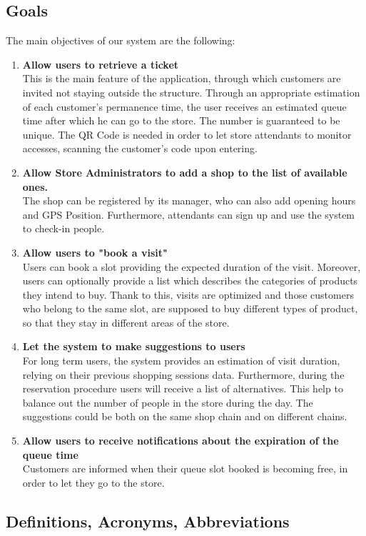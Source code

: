 \documentclass[table, 12pt]{article}
\begin{document}
\subsection{Goals}
\label{goals}
The main objectives of our system are the following:
\begin{enumerate}[label=$\bullet$ \textbf{G\arabic*:}]
    \item \textbf{Allow users to retrieve a ticket}\\This is the main feature of the application, through which customers are invited not staying outside the structure. Through an appropriate estimation of each customer's permanence time, the user receives an estimated queue time after which he can go to the store. The number is guaranteed to be unique. The QR Code is needed in order to let store attendants to monitor accesses, scanning the customer's code upon entering.
    \item \textbf{Allow Store Administrators to add a shop to the list of available ones.}\\The shop can be registered by its manager, who can also add opening hours and GPS Position. Furthermore, attendants can sign up and use the system to check-in people.
    \item \textbf{Allow users to "book a visit"}\\Users can book a slot providing the expected duration of the visit. Moreover, users can optionally provide a list which describes the categories of products they intend to buy. Thank to this, visits are optimized and those customers who belong to the same slot, are supposed to buy different types of product, so that they stay in different areas of the store.
    \item \textbf{Let the system to make suggestions to users}\\For long term users, the system provides an estimation of visit duration, relying on their previous shopping sessions data. Furthermore, during the reservation procedure users will receive a list of alternatives. This help to balance out the number of people in the store during the day. The suggestions could be both on the same shop chain and on different chains.
    \item \textbf{Allow users to receive notifications about the expiration of the queue time}\\Customers are informed when their queue slot booked is becoming free, in order to let they go to the store.
\end{enumerate}
\subsection{Definitions, Acronyms, Abbreviations}
\end{document}
